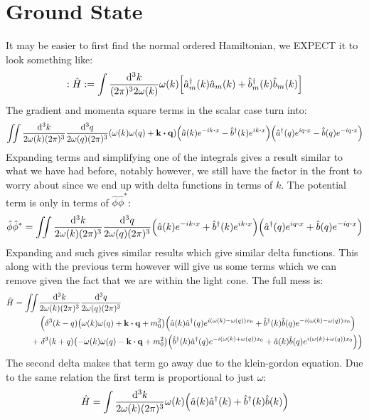 \documentclass[12pt]{article}
\newcommand{\phih}{\hat{\phi}}
\newcommand{\phish}{\hat{\phi}^*}
\newcommand{\ahat}{\hat{a}}
\newcommand{\ahatd}{\hat{a}^\dag}
\newcommand{\bhat}{\hat{b}}
\newcommand{\bhatd}{\hat{b}^\dag}
\begin{document}
\section{Ground State}
It may be easier to first find the normal ordered Hamiltonian, we EXPECT it to look something like:
\begin{align*}
  :\hat{H}:=\int\frac{\dd[3]{k}}{(2\pi)^32\omega(k)}\omega(k)
  \qty[\ahatd_m(k)\ahat_m(k)+\bhatd_m(k)\bhat_m(k)]
\end{align*}
The gradient and momenta square terms in the scalar case turn into:
\begin{align*}
  \iint\frac{\dd[3]{k}}{2\omega(k)(2\pi)^3}\frac{\dd[3]{q}}{2\omega(q)(2\pi)^3}
  \qty(\omega(k)\omega(q)+\vb{k}\vdot\vb{q})
  \qty(\ahat(k)e^{-ik\vdot x}-\bhatd(k)e^{ik\vdot x})
  \qty(\ahatd(q)e^{iq\vdot x}-\bhat(q)e^{-iq\vdot x})
\end{align*}
Expanding terms and simplifying one of the integrals gives a result similar to what we have had before, notably however, we still have the factor in the front to worry about since we end up with delta functions in terms of $k$. The potential term is only in terms of $\phih\phish$:
\begin{align*}
  \phih\phish=
  \iint\frac{\dd[3]{k}}{2\omega(k)(2\pi)^3}\frac{\dd[3]{q}}{2\omega(q)(2\pi)^3}
  \qty(\ahat(k)e^{-ik\vdot x}+\bhatd(k)e^{ik\vdot x})
  \qty(\ahatd(q)e^{iq\vdot x}+\bhat(q)e^{-iq\vdot x})
\end{align*}
Expanding and such gives similar results which give similar delta functions. This along with the previous term however will give us some terms which we can remove given the fact that we are within the light cone. The full mess is:
\begin{align*}
  \hat{H}=\iint&\frac{\dd[3]{k}}{2\omega(k)(2\pi)^3}
  \frac{\dd[3]{q}}{2\omega(q)(2\pi)^3}\\
  &\left(\delta^3(k-q)\qty(\omega(k)\omega(q)+\vb{k\vdot q}+m^2_0)
    \qty(\ahat(k)\ahatd(q)e^{i(\omega(k)-\omega(q))x_0}
    +\bhatd(k)\bhat(q)e^{-i(\omega(k)-\omega(q))x_0})\right.\\
  +&\left.\delta^3(k+q)\qty(-\omega(k)\omega(q)-\vb{k\vdot q}+m^2_0)
    \qty(\bhatd(k)\ahatd(q)e^{-i(\omega(k)+\omega(q))x_0}
    +\ahat(k)\bhat(q)e^{i(\omega(k)+\omega(q))x_0})\right)
\end{align*}
The second delta makes that term go away due to the klein-gordon equation. Due to the same relation the first term is proportional to just $\omega$:
\begin{align*}
  \hat{H}=\int\frac{\dd[3]{k}}{2\omega(k)(2\pi)^3}\omega(k)
  \qty(\ahat(k)\ahatd(k)+\bhatd(k)\bhat(k))
\end{align*}
\end{document}
